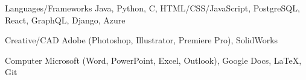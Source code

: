 
\begin{cvskills}
  \cvskill
  {Languages/Frameworks} %
  {Java, Python, C, HTML/CSS/JavaScript, PostgreSQL, React, GraphQL, Django, Azure} %

  \cvskill
  {Creative/CAD} %
  {Adobe (Photoshop, Illustrator, Premiere Pro), SolidWorks} %

  \cvskill
  {Computer} %
  {Microsoft (Word, PowerPoint, Excel, Outlook), Google Docs, LaTeX, Git} %
\end{cvskills}
